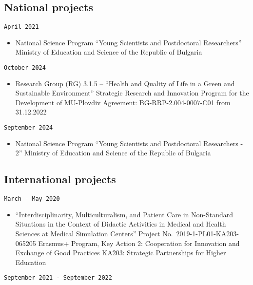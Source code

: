 \documentclass[
  12pt,
  letterpaper,
  DIV=11,
  numbers=noendperiod]{scrartcl}
\providecommand{\tightlist}{%
  \setlength{\itemsep}{0pt}\setlength{\parskip}{0pt}}\usepackage{longtable,booktabs,array}
\begin{document}
\subsection{National projects}\label{national-projects}

\texttt{April\ 2021}

\begin{itemize}
\tightlist
\item
  National Science Program ``Young Scientists and Postdoctoral
  Researchers'' \textbar{} Ministry of Education and Science of the
  Republic of Bulgaria
\end{itemize}

\texttt{October\ 2024}

\begin{itemize}
\tightlist
\item
  Research Group (RG) 3.1.5 -- ``Health and Quality of Life in a Green
  and Sustainable Environment'' \textbar{} Strategic Research and
  Innovation Program for the Development of MU-Plovdiv \textbar{}
  Agreement: BG-RRP-2.004-0007-C01 from 31.12.2022
\end{itemize}

\texttt{September\ 2024}

\begin{itemize}
\tightlist
\item
  National Science Program ``Young Scientists and Postdoctoral
  Researchers - 2'' \textbar{} Ministry of Education and Science of the
  Republic of Bulgaria
\end{itemize}

\subsection{International projects}\label{international-projects}

\texttt{March\ -\ May\ 2020}

\begin{itemize}
\tightlist
\item
  ``Interdisciplinarity, Multiculturalism, and Patient Care in
  Non-Standard Situations in the Context of Didactic Activities in
  Medical and Health Sciences at Medical Simulation Centers'' \textbar{}
  Project No.~2019-1-PL01-KA203-065205 \textbar{} Erasmus+ Program, Key
  Action 2: Cooperation for Innovation and Exchange of Good Practices
  \textbar{} KA203: Strategic Partnerships for Higher Education
\end{itemize}

\texttt{September\ 2021\ -\ September\ 2022}
\end{document}
